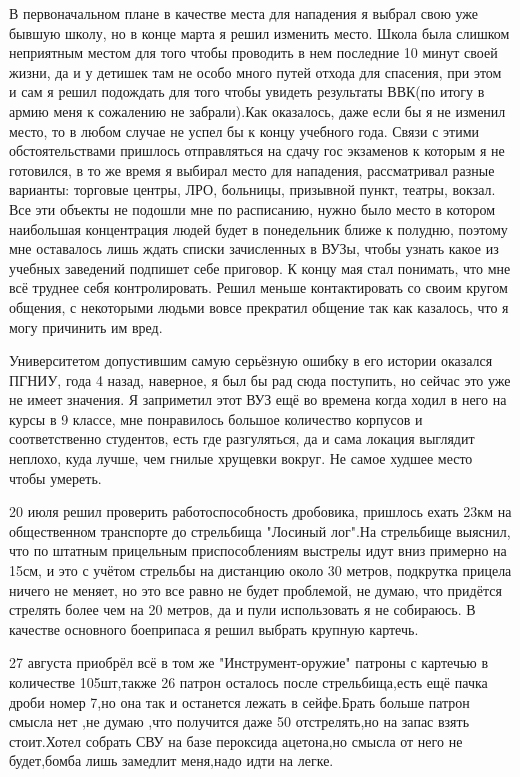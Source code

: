 \begin{itemize}
\begin{itemize}
В первоначальном плане в качестве места для нападения я выбрал свою уже бывшую
школу, но в конце марта я решил изменить место. Школа была слишком неприятным
местом для того чтобы проводить в нем последние 10 минут своей жизни, да и у
детишек там не особо много путей отхода для спасения, при этом и сам я решил
подождать для того чтобы увидеть результаты ВВК(по итогу в армию меня к
сожалению не забрали).Как оказалось, даже если бы я не изменил место, то в любом
случае не успел бы к концу учебного года. Связи с этими обстоятельствами
пришлось отправляться на сдачу гос экзаменов к которым я не готовился, в то же
время я выбирал место для нападения, рассматривал разные варианты: торговые
центры, ЛРО, больницы, призывной пункт, театры, вокзал. Все эти объекты не подошли
мне по расписанию, нужно было место в котором наибольшая концентрация людей
будет в понедельник ближе к полудню, поэтому мне оставалось лишь ждать списки
зачисленных в ВУЗы, чтобы узнать какое из учебных заведений подпишет себе
приговор. К концу мая стал понимать, что мне всё труднее себя
контролировать. Решил меньше контактировать со своим кругом общения, с некоторыми
людьми вовсе прекратил общение так как казалось, что я могу причинить им вред.

Университетом допустившим самую серьёзную ошибку в его истории оказался
ПГНИУ, года 4 назад, наверное, я был бы рад сюда поступить, но сейчас это уже не
имеет значения. Я заприметил этот ВУЗ ещё во времена когда ходил в него на курсы
в 9 классе, мне понравилось большое количество корпусов и соответственно
студентов, есть где разгуляться, да и сама локация выглядит неплохо, куда
лучше, чем гнилые хрущевки вокруг. Не самое худшее место чтобы умереть.



20 июля решил проверить работоспособность дробовика, пришлось ехать 23км на
общественном транспорте до стрельбища "Лосиный лог".На стрельбище выяснил, что
по штатным прицельным приспособлениям выстрелы идут вниз примерно на 15см, и
это с учётом стрельбы на дистанцию около 30 метров, подкрутка прицела ничего не
меняет, но это все равно не будет проблемой, не думаю, что придётся стрелять
более чем на 20 метров, да и пули использовать я не собираюсь. В качестве
основного боеприпаса я решил выбрать крупную картечь.

27 августа приобрёл всё в том же "Инструмент-оружие" патроны с картечью в
количестве 105шт,также 26 патрон осталось после стрельбища,есть ещё пачка дроби
номер 7,но она так и останется лежать в сейфе.Брать больше патрон смысла нет
,не думаю ,что получится даже 50 отстрелять,но на запас взять стоит.Хотел
собрать СВУ на базе пероксида ацетона,но смысла от него не будет,бомба лишь
замедлит меня,надо идти на легке.


\end{itemize}
\end{itemize}
